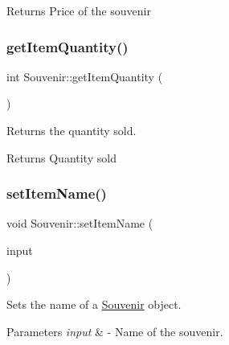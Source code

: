 \begin{DoxyReturn}{Returns}
Price of the souvenir 
\end{DoxyReturn}
\mbox{\label{class_souvenir_a81daf860165ee3d675782a8039de2217}} 
\subsubsection{\texorpdfstring{get\+Item\+Quantity()}{getItemQuantity()}}
{\footnotesize\ttfamily int Souvenir\+::get\+Item\+Quantity (\begin{DoxyParamCaption}{ }\end{DoxyParamCaption})\hspace{0.3cm}{\ttfamily [inline]}}



Returns the quantity sold. 

\begin{DoxyReturn}{Returns}
Quantity sold 
\end{DoxyReturn}
\mbox{\label{class_souvenir_a8d1cd526ab97dc2c708adaddeaa4e84a}} 
\subsubsection{\texorpdfstring{set\+Item\+Name()}{setItemName()}}
{\footnotesize\ttfamily void Souvenir\+::set\+Item\+Name (\begin{DoxyParamCaption}\item[{Q\+String}]{input }\end{DoxyParamCaption})\hspace{0.3cm}{\ttfamily [inline]}}



Sets the name of a \hyperlink{class_souvenir}{Souvenir} object. 


\begin{DoxyParams}{Parameters}
{\em input} & -\/ Name of the souvenir. \\
\hline
\end{DoxyParams}
\mbox{\label{class_souvenir_ac64dead1ef1668fabd93c4bf5ca11a56}} 

